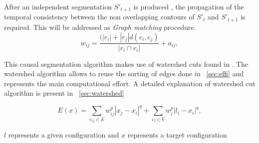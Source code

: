 After an independent segmentation \(S'_{t+1}\)  is produced , the propagation of the temporal consistency between the non overlapping contours of \(S'_{t}\) and \(S'_{t+1}\) is required. This will be addressed as \textit{Graph matching} procedure.
\begin{equation}
 w_{ij}=\frac{(|r_{i}|+|r_{j}|d(c_{i},c_{j})}{|r_{i} \cap r_{i}|} + a_{ij},
 \label{equ:graphmatch}
\end{equation}


This causal segmentation algorithm makes use of watershed cuts found in \textcite{cousty2009watershed}. The watershed algorithm allows to reuse the sorting of edges done in  ~\ref{sec:effi} and represents the main computational effort. A detailed explanation of watershed cut algorithm is present in ~\ref{sec:watershed}

\begin{equation}
 E(x)=\sum_{e_{ij} \in E} w^p_{ij}|x_{j}-x_{i}|^q + \sum_{v_{i} \in V} w^p_{i}|l_{i}-x_{i}|^q,
 \label{equ:globopt}
\end{equation} 

\(l\) represents a given configuration and \(x\) represents a target configuration

 





